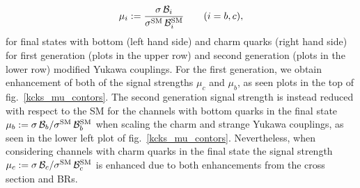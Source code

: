 \begin{equation}
	\mu_i : = \frac{\sigma \, {\cal B}_i } {\sigma^{\mathrm{SM}} \, {\cal B}_i^{\mathrm{SM}}}\quad \quad (i=b,c),
\end{equation}
for final states with bottom (left hand side) and charm quarks (right hand side) for first generation (plots in the upper row) and second generation (plots in the lower row) modified Yukawa couplings. For the first generation, we obtain enhancement of both of the signal strengths $\mu_c$ and $\mu_b$, as seen  plots in the top of fig.~\ref{kcks_mu_contors}. The  second generation  signal strength is instead reduced with respect to the SM for the channels with bottom quarks in the final state $\mu_b : = \sigma \, {\cal B}_b/ \sigma ^{\mathrm{SM}}\, {\cal B}_b^{\mathrm{SM}}$ when scaling the charm and strange Yukawa couplings, as seen in the lower left plot of fig.~\ref{kcks_mu_contors}. Nevertheless, when considering channels with charm quarks in the final state the signal strength $\mu_c : = \sigma \, {\cal B}_c /\sigma^{\mathrm{SM}} \, {\cal B}_c^{\mathrm{SM}} $ is enhanced due to both enhancements from the cross section and BRs.
